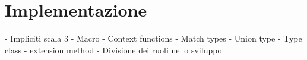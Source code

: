 \chapter{Implementazione}\label{ch:implementazione}
- Impliciti scala 3
- Macro
- Context functions
- Match types
- Union type
- Type class
- extension method
- Divisione dei ruoli nello sviluppo